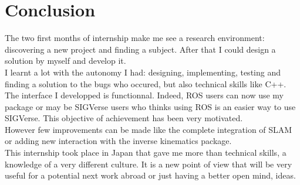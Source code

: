 \chapter{Conclusion}
\setlength{\parskip}{2.5ex plus .4ex minus .4ex}
The two first months of internship make me see a research environment: discovering a new project and finding a subject. After that I could design a solution by myself and develop it.\\
I learnt a lot with the autonomy I had: designing, implementing, testing and finding a solution to the bugs who occured, but also technical skills like C++.\\

The interface I developped is functionnal. Indeed, ROS users can now use my package or may be SIGVerse users who thinks using ROS is an easier way to use SIGVerse. This objective of achievement has been very motivated.\\
However few improvements can be made like the complete integration of SLAM or adding new interaction with the inverse kinematics package.\\

This internship took place in Japan that gave me more than technical skills, a knowledge of a very different culture. It is a new point of view that will be very useful for a potential next work abroad or just having a better open mind, ideas. 


%
